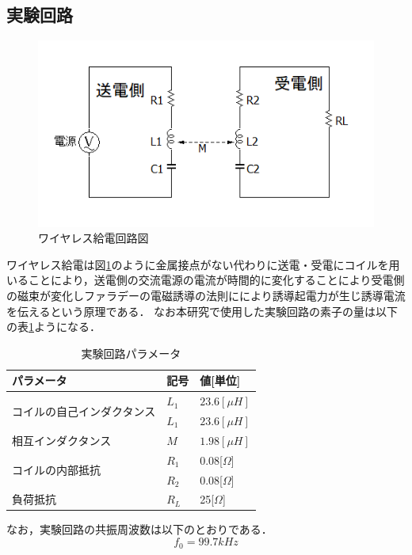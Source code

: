 \documentclass[10pt,a4paper,twocolumn]{jarticle}
\begin{document}
\subsection{実験回路}
\begin{figure}[h]
	\centering
	\includegraphics[scale=0.6]{wpt_2020128.png}
	\caption{ワイヤレス給電回路図}
	\label{fig:wpt_kairo}
\end{figure}
ワイヤレス給電は図\ref{fig:wpt_kairo}のように金属接点がない代わりに送電・受電にコイルを用いることにより，送電側の交流電源の電流が時間的に変化することにより受電側の磁束が変化しファラデーの電磁誘導の法則ににより誘導起電力が生じ誘導電流を伝えるという原理である．
なお本研究で使用した実験回路の素子の量は以下の表\ref{tab:para}ようになる．
\begin{table}[h]
	\centering
	\caption{実験回路パラメータ}
	\label{tab:para}
	\begin{tabular}{|l|l|l|}
		\hline
		パラメータ                          & 記号    & 値{[}単位{]}          \\ \hline
		\multirow{2}{*}{コイルの自己インダクタンス} & $L_1$ & $23.6[\mu H]$      \\ \cline{2-3} 
		& $L_1$ & $23.6[\mu H]$      \\ \hline
		相互インダクタンス                      & $M$   & $1.98[\mu H]$      \\ \hline
		\multirow{2}{*}{コイルの内部抵抗}      & $R_1$ & 0.08{[}$\Omega${]}  \\ \cline{2-3} 
		& $R_2$ & 0.08{[}$\Omega${]} \\ \hline
		負荷抵抗                           & $R_L$ & 25{[}$\Omega${]}   \\ \hline
	\end{tabular}
\end{table}
なお，実験回路の共振周波数は以下のとおりである．
\begin{equation}
f_0=99.7kHz \nonumber
\end{equation}
\end{document}
